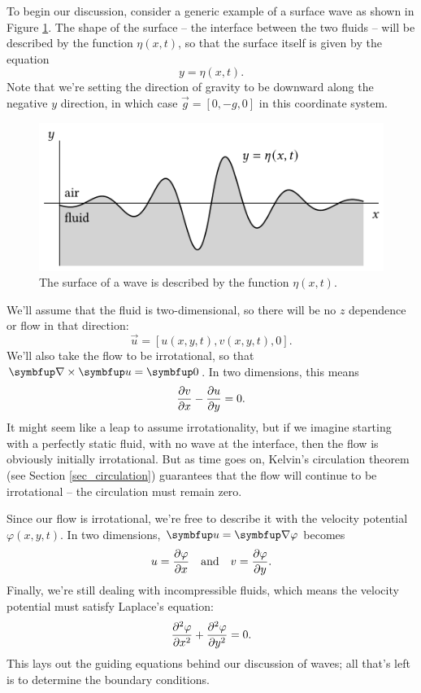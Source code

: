 To begin our discussion, consider a generic example of a surface wave as shown in Figure \ref{fig_generic_wave}.  The shape of the surface -- the interface between the two fluids -- will be described by the function $\eta(x, t)$, so that the surface itself is given by the equation
\begin{equation}
y = \eta(x, t).
\end{equation}
Note that we're setting the direction of gravity to be downward along the negative $y$ direction, in which case $\vec{g} = [0, -g, 0]$ in this coordinate system.

\begin{figure}
\centering\includegraphics[width=0.8\linewidth]{Figures/Chapter5/fig_generic_wave}
\caption{The surface of a wave is described by the function $\eta(x, t)$.}
\label{fig_generic_wave}
\end{figure}

We'll assume that the fluid is two-dimensional, so there will be no $z$ dependence or flow in that direction:
\[
\vec{u} = [u(x, y, t), v(x, y, t), 0].
\]
We'll also take the flow to be irrotational, so that $\curl \vec{u} = \vec{0}$.  In two dimensions, this means
\[
\frac{\partial {v}}{\partial {x}} - \frac{\partial {u}}{\partial {y}} = 0.
\]
It might seem like a leap to assume irrotationality, but if we imagine starting with a perfectly static fluid, with no wave at the interface, then the flow is obviously initially irrotational.  But as time goes on, Kelvin's circulation theorem (see Section \ref{sec_circulation}) guarantees that the flow will continue to be irrotational -- the circulation must remain zero.

Since our flow is irrotational, we're free to describe it with the velocity potential $\varphi(x, y, t)$.  In two dimensions, $\vec{u} = \grad \varphi$ becomes
\begin{equation}
u = \frac{\partial {\varphi}}{\partial {x}} \quad \text{and} \quad v = \frac{\partial {\varphi}}{\partial {y}}.
\end{equation}
Finally, we're still dealing with incompressible fluids, which means the velocity potential must satisfy Laplace's equation:
\begin{equation}
\frac{\partial^2 {\varphi}}{\partial {x}^2} + \frac{\partial^2 {\varphi}}{\partial {y}^2} = 0.
\end{equation}
This lays out the guiding equations behind our discussion of waves; all that's left is to determine the boundary conditions.

